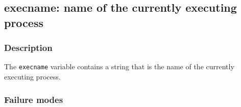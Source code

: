 \clearpage
{}
{}
\label{vars:arg09}
\subsection*{execname: name of the currently executing process}

\subsubsection*{Description}

The \verb|execname| variable contains a string that is the name of the
currently executing process.

\subsubsection*{Failure modes}


